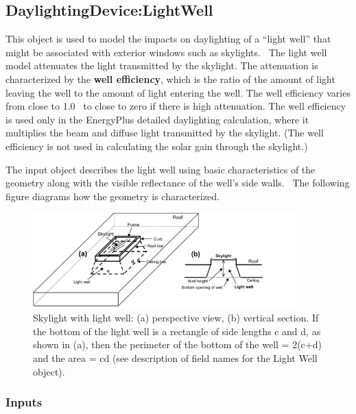 \subsection{DaylightingDevice:LightWell}\label{daylightingdevicelightwell}

This object is used to model the impacts on daylighting of a ``light well'' that might be associated with exterior windows such as skylights.~ The light well model attenuates the light transmitted by the skylight. The attenuation is characterized by the \textbf{well efficiency}, which is the ratio of the amount of light leaving the well to the amount of light entering the well. The well efficiency varies from close to 1.0~ to close to zero if there is high attenuation. The well efficiency is used only in the EnergyPlus detailed daylighting calculation, where it multiplies the beam and diffuse light transmitted by the skylight. (The well efficiency is not used in calculating the solar gain through the skylight.)

The input object describes the light well using basic characteristics of the geometry along with the visible reflectance of the well's side walls.~ The following figure diagrams how the geometry is characterized.

\begin{figure}[hbtp] %
\centering
\includegraphics[width=0.9\textwidth, height=0.9\textheight, keepaspectratio=true]{media/image112.png}
\caption{Skylight with light well: (a) perspective view, (b) vertical section. If the bottom of the light well is a rectangle of side lengths c and d, as shown in (a), then the perimeter of the bottom of the well = 2(c+d) and the area = cd (see description of field names for the Light Well object). \protect \label{fig:skylight-with-light-well-a-perspective-view-b}}
\end{figure}

\subsubsection{Inputs}\label{inputs-8-004}

